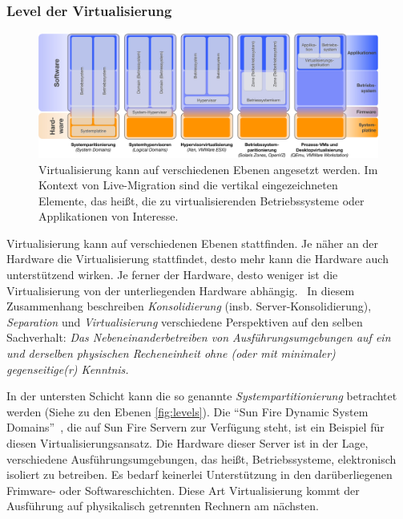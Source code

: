 \subsubsection{Level der Virtualisierung}
\label{sec:def-virtualisierung}

\begin{figure}[htbp]
  \centering
  \includegraphics[width=\textwidth]{images/Virtualisierungslevel}
  \caption{Virtualisierung kann auf verschiedenen Ebenen angesetzt werden. Im Kontext von Live-Migration sind die vertikal eingezeichneten Elemente, das heißt, die zu virtualisierenden Betriebssysteme oder Applikationen von Interesse. }
  \label{fig:levels}
\end{figure}

Virtualisierung kann auf verschiedenen Ebenen stattfinden. Je näher an
der Hardware die Virtualisierung stattfindet, desto mehr kann die
Hardware auch unterstützend wirken. Je ferner der Hardware, desto
weniger ist die Virtualisierung von der unterliegenden Hardware
abhängig.~\cite{Giesekus2010:Virtualisierung} In diesem Zusammenhang
beschreiben \emph{Konsolidierung} (insb. Server-Konsolidierung),
\emph{Separation} und \emph{Virtualisierung} verschiedene Perspektiven
auf den selben Sachverhalt: \emph{Das Nebeneinanderbetreiben von
Ausführungsumgebungen auf ein und derselben physischen Recheneinheit
ohne (oder mit minimaler) gegenseitige(r) Kenntnis.}

In der untersten Schicht kann die so genannte
\emph{Systempartitionierung} betrachtet werden (Siehe zu den Ebenen
\autoref{fig:levels}). Die "`Sun Fire Dynamic System
Domains"'~\cite{Shoumack2007:Beginners-Guid-}, die auf Sun Fire
Servern zur Verfügung steht, ist ein Beispiel für diesen
Virtualisierungsansatz. Die Hardware dieser Server ist in der Lage,
verschiedene Ausführungsumgebungen, das heißt, Betriebssysteme,
elektronisch isoliert zu betreiben. Es bedarf keinerlei Unterstützung
in den darüberliegenen Frimware- oder Softwareschichten. Diese Art
Virtualisierung kommt der Ausführung auf physikalisch getrennten
Rechnern am nächsten.

